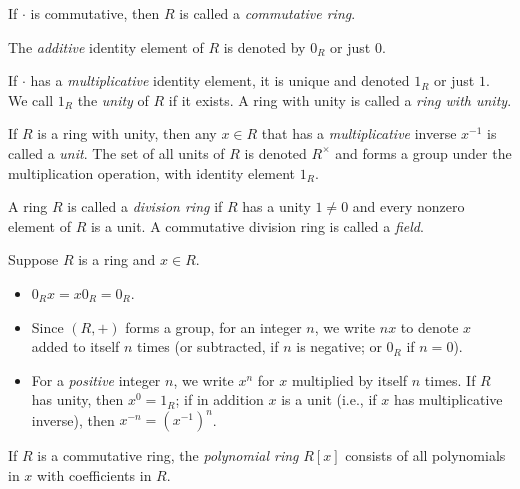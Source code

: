 \begin{definition}
	If $\cdot$ is commutative, then $R$ is called a \emph{commutative ring}.
\end{definition}

\begin{notation}
	The \emph{additive} identity element of $R$ is denoted by $0_R$ or just $0$.
\end{notation}

\begin{definition}
	If $\cdot$ has a \emph{multiplicative} identity element, it is unique and
	denoted $1_R$ or just $1$. We call $1_R$ the \emph{unity} of $R$ if it exists.
	A ring with unity is called a \emph{ring with unity}.
\end{definition}

\begin{definition}
	If $R$ is a ring with unity, then any $x \in R$ that has a
	\emph{multiplicative} inverse $x^{-1}$ is called a \emph{unit}. The set of all
	units of $R$ is denoted $R^\times$ and forms a group under the multiplication
	operation, with identity element $1_R$.
\end{definition}

\begin{definition}
	A ring $R$ is called a \emph{division ring} if $R$ has a unity $1 \neq 0$ and
	every nonzero element of $R$ is a unit. A commutative division ring is called
	a \emph{field}.
\end{definition}

\begin{facts}
	Suppose $R$ is a ring and $x \in R$.
	\begin{itemize}
		\item $0_R x = x 0_R = 0_R$.
		\item Since $(R, +)$ forms a group, for an integer $n$, we write $nx$ to
			denote $x$ added to itself $n$ times (or subtracted, if $n$ is negative;
			or $0_R$ if $n = 0$).
		\item For a \emph{positive} integer $n$, we write $x^n$ for $x$ multiplied
			by itself $n$ times. If $R$ has unity, then $x^0 = 1_R$; if in addition
			$x$ is a unit (i.e., if $x$ has multiplicative inverse), then $x^{-n} =
			{(x^{-1})}^n$.
	\end{itemize}
\end{facts}

\begin{definition}
	If $R$ is a commutative ring, the \emph{polynomial ring} $R[x]$ consists of
	all polynomials in $x$ with coefficients in $R$.
\end{definition}

